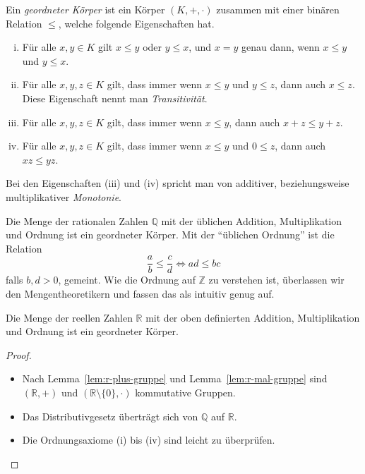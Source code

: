 \documentclass[../main.tex]{subfiles}
\begin{document}
\begin{definition}
  Ein \emph{geordneter Körper} ist ein Körper $(K, +, \cdot)$
  zusammen mit einer binären Relation $\leq$, welche folgende
  Eigenschaften hat.
  \begin{enumerate}[(i)]
    \item Für alle $x, y \in K$ gilt $x \leq y$ oder $y \leq x$,
      und $x = y$ genau dann, wenn $x \leq y$ und $y \leq x$.
    \item Für alle $x, y, z \in K$ gilt, dass immer wenn
      $x \leq y$ und $y \leq z$, dann auch $x \leq z$. Diese
      Eigenschaft nennt man \emph{Transitivität}.
    \item Für alle $x, y, z \in K$ gilt, dass immer wenn
      $x \leq y$, dann auch $x + z \leq y + z$.
    \item Für alle $x, y, z \in K$ gilt, dass immer wenn
      $x \leq y$ und $0 \leq z$, dann auch $xz \leq yz$.
  \end{enumerate}
  Bei den Eigenschaften (iii) und (iv) spricht man von additiver,
  beziehungsweise multiplikativer \emph{Monotonie}.
\end{definition}

\begin{example}
  Die Menge der rationalen Zahlen $\mathbb Q$ mit der üblichen
  Addition, Multiplikation und Ordnung ist ein geordneter Körper.
  Mit der ``üblichen Ordnung'' ist die Relation
  \[ \frac{a}{b} \leq \frac{c}{d} \Leftrightarrow ad \leq bc\]
  falls $b, d > 0$, gemeint.
  Wie die Ordnung auf $\mathbb Z$ zu verstehen ist, überlassen
  wir den Mengentheoretikern und fassen das als intuitiv genug auf.
\end{example}

\begin{theorem}
  Die Menge der reellen Zahlen $\mathbb R$ mit der oben definierten
  Addition, Multiplikation und Ordnung ist ein geordneter Körper.
\end{theorem}

\begin{proof}
  \leavevmode
  \begin{itemize}
    \item Nach Lemma~\ref{lem:r-plus-gruppe} und 
      Lemma~\ref{lem:r-mal-gruppe} sind $(\mathbb R, +)$ und
      $(\mathbb R \setminus \{0\}, \cdot)$ kommutative Gruppen.
    \item Das Distributivgesetz überträgt sich von $\mathbb Q$
      auf $\mathbb R$.
    \item Die Ordnungsaxiome (i) bis (iv) sind leicht zu überprüfen.
      \qedhere
  \end{itemize}
\end{proof}
\end{document}
